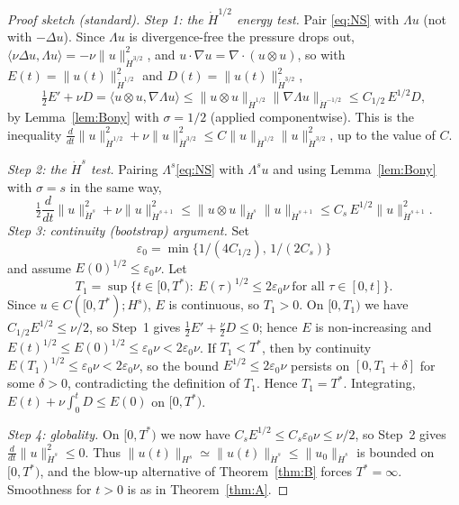 \documentclass[11pt,reqno]{amsart}
\theoremstyle{definition}
\theoremstyle{remark}
\newcommand{\dH}[1]{\dot H^{#1}}
\newcommand{\norm}[1]{\lVert #1\rVert}
\newcommand{\ip}[2]{\langle #1,#2\rangle}
\begin{document}
\begin{proof}[Proof sketch (standard)]
\emph{Step 1: the $\dH{1/2}$ energy test.} Pair \eqref{eq:NS} with $\Lambda u$ (not with $-\Delta u$). Since $\Lambda u$ is divergence-free the pressure drops out, $\ip{\nu\Delta u}{\Lambda u}=-\nu\norm{u}_{\dH{3/2}}^2$, and $u\cdot\nabla u=\nabla\cdot(u\otimes u)$, so with $E(t)=\norm{u(t)}_{\dH{1/2}}^2$ and $D(t)=\norm{u(t)}_{\dH{3/2}}^2$,
\[
\tfrac12E'+\nu D=\ip{u\otimes u}{\nabla\Lambda u}\le\norm{u\otimes u}_{\dH{1/2}}\norm{\nabla\Lambda u}_{\dH{-1/2}}\le C_{1/2}\,E^{1/2}D,
\]
by Lemma~\ref{lem:Bony} with $\sigma=1/2$ (applied componentwise). This is the inequality $\frac{d}{dt}\norm{u}_{\dH{1/2}}^2+\nu\norm{u}_{\dH{3/2}}^2\le C\norm{u}_{\dH{1/2}}\norm{u}_{\dH{3/2}}^2$, up to the value of $C$.

\emph{Step 2: the $\dH{s}$ test.} Pairing $\Lambda^s$\eqref{eq:NS} with $\Lambda^su$ and using Lemma~\ref{lem:Bony} with $\sigma=s$ in the same way,
\[
\tfrac12\frac{d}{dt}\norm{u}_{\dH{s}}^2+\nu\norm{u}_{\dH{s+1}}^2\le\norm{u\otimes u}_{\dH{s}}\norm{u}_{\dH{s+1}}\le C_s\,E^{1/2}\norm{u}_{\dH{s+1}}^2 .
\]
\emph{Step 3: continuity (bootstrap) argument.} Set
\[
\varepsilon_0=\min\bigl\{1/(4C_{1/2}),\,1/(2C_s)\bigr\}
\]
and assume $E(0)^{1/2}\le\varepsilon_0\nu$. Let
\[
T_1=\sup\bigl\{t\in[0,T^*):\ E(\tau)^{1/2}\le2\varepsilon_0\nu\ \text{for all }\tau\in[0,t]\bigr\}.
\]
Since $u\in C([0,T^*);H^s)$, $E$ is continuous, so $T_1>0$. On $[0,T_1)$ we have $C_{1/2}E^{1/2}\le\nu/2$, so Step~1 gives $\tfrac12E'+\tfrac{\nu}{2}D\le0$; hence $E$ is non-increasing and $E(t)^{1/2}\le E(0)^{1/2}\le\varepsilon_0\nu<2\varepsilon_0\nu$. If $T_1<T^*$, then by continuity $E(T_1)^{1/2}\le\varepsilon_0\nu<2\varepsilon_0\nu$, so the bound $E^{1/2}\le2\varepsilon_0\nu$ persists on $[0,T_1+\delta]$ for some $\delta>0$, contradicting the definition of $T_1$. Hence $T_1=T^*$. Integrating, $E(t)+\nu\int_0^tD\le E(0)$ on $[0,T^*)$.

\emph{Step 4: globality.} On $[0,T^*)$ we now have $C_sE^{1/2}\le C_s\varepsilon_0\nu\le\nu/2$, so Step~2 gives $\frac{d}{dt}\norm{u}_{\dH{s}}^2\le0$. Thus $\norm{u(t)}_{H^s}\simeq\norm{u(t)}_{\dH{s}}\le\norm{u_0}_{\dH{s}}$ is bounded on $[0,T^*)$, and the blow-up alternative of Theorem~\ref{thm:B} forces $T^*=\infty$. Smoothness for $t>0$ is as in Theorem~\ref{thm:A}.
\end{proof}
\end{document}
